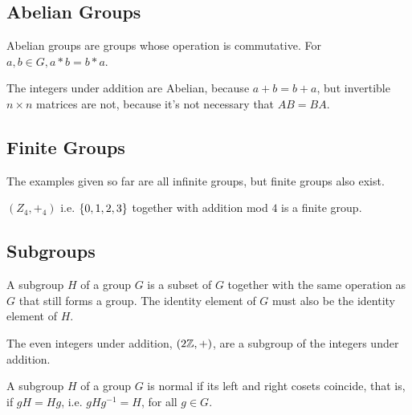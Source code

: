 \documentclass{article}
\begin{document}
\subsection{Abelian Groups}

\begin{definition}[Abelian]
Abelian \@{groups} are groups whose operation is commutative. For $a,b \in G, a * b = b * a$.
\end{definition}

\begin{example}\label{abelian-examples}
The \@{integers} under addition are \@{Abelian}, because $a + b = b + a$, but invertible $n \times n$ matrices are not, because it's not necessary that $AB = BA$.
\end{example}

\subsection{Finite Groups}

The examples given so far are all infinite \@{groups}, but finite groups also exist.

\begin{example}\label{z4-finite-group}
$(Z_4, +_4)$ i.e. $\left\{ 0, 1, 2, 3 \right\}$ together with addition mod $4$ is a finite \@{group}.
\end{example}

\subsection{Subgroups}

\begin{definition}[subgroup]
A subgroup $H$ of a \@{group} $G$ is a \@{subset} of $G$ together with the same operation as $G$ that still forms a group. The identity element of $G$ must also be the identity element of $H$.
\end{definition}

\begin{example}\label{even-integers-subgroup}
The even integers under addition, $(2\mathbb{Z}, +)$, are a \@{subgroup} of the \@{integers} under addition.
\end{example}

\begin{definition}[normal]
A \@{subgroup} $H$ of a \@{group} $G$ is normal if its left and right \@{cosets} coincide, that is, if $gH = Hg$, i.e. $gHg^{-1} = H$, for all $g \in G$.
\end{definition}
\end{document}
